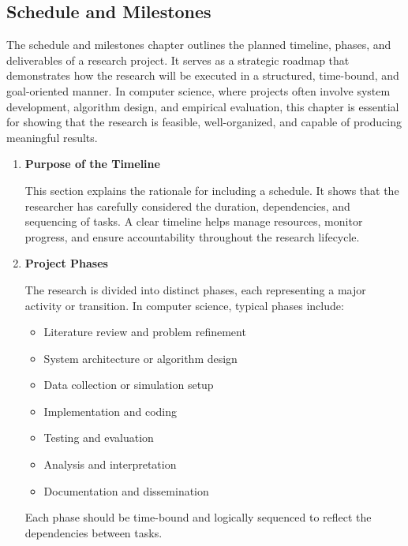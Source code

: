 \documentclass[PCOM,Proposal,Review]{mpThesis}
\newcommand{\Hd}[1]{{\color{SteelBlue}\bf#1}}
\begin{document}
\begin{MainMatter}
\chapter{Schedule and Milestones}
\label{ch:schedule}
\minitoc

\begin{Remark}
The schedule and milestones chapter outlines the planned timeline, phases, and deliverables of a research project.
It serves as a strategic roadmap that demonstrates how the research will be executed in a structured, time-bound, and goal-oriented manner.
In computer science, where projects often involve system development, algorithm design, and empirical evaluation,
this chapter is essential for showing that the research is feasible, well-organized, and capable of producing meaningful results.
\begin{enumerate}
\item \Hd{Purpose of the Timeline}

This section explains the rationale for including a schedule.
It shows that the researcher has carefully considered the duration, dependencies, and sequencing of tasks.
A clear timeline helps manage resources, monitor progress, and ensure accountability throughout the research lifecycle.

\item \Hd{Project Phases}

The research is divided into distinct phases, each representing a major activity or transition.
In computer science, typical phases include:
  \begin{itemize}
  \item Literature review and problem refinement

  \item System architecture or algorithm design

  \item Data collection or simulation setup

  \item Implementation and coding

  \item Testing and evaluation

  \item Analysis and interpretation

  \item Documentation and dissemination
  \end{itemize}
Each phase should be time-bound and logically sequenced to reflect the dependencies between tasks.


\end{enumerate}
\end{Remark}
\end{MainMatter}
\end{document}
